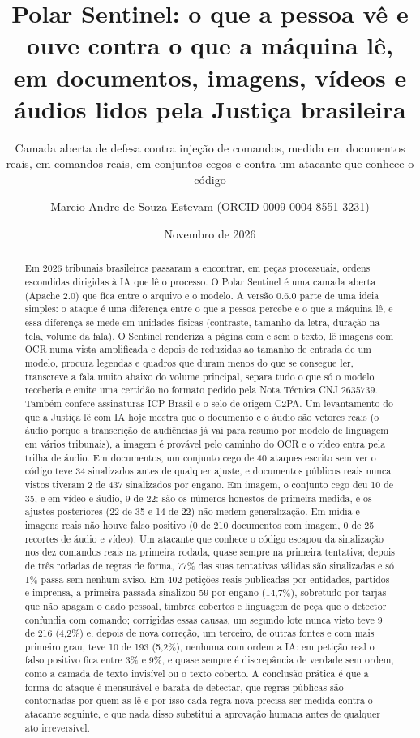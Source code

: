 \documentclass[
  brazilian,
  11pt,
]{article}
\title{Polar Sentinel: o que a pessoa vê e ouve contra o que a máquina
lê, em documentos, imagens, vídeos e áudios lidos pela Justiça
brasileira}
\subtitle{Camada aberta de defesa contra injeção de comandos, medida em
documentos reais, em comandos reais, em conjuntos cegos e contra um
atacante que conhece o código}
\author{Marcio Andre de Souza Estevam (ORCID
\href{https://orcid.org/0009-0004-8551-3231}{0009-0004-8551-3231})}
\date{Novembro de 2026}
\begin{document}
\maketitle
\begin{abstract}
Em 2026 tribunais brasileiros passaram a encontrar, em peças
processuais, ordens escondidas dirigidas à IA que lê o processo. O Polar
Sentinel é uma camada aberta (Apache 2.0) que fica entre o arquivo e o
modelo. A versão 0.6.0 parte de uma ideia simples: o ataque é uma
diferença entre o que a pessoa percebe e o que a máquina lê, e essa
diferença se mede em unidades físicas (contraste, tamanho da letra,
duração na tela, volume da fala). O Sentinel renderiza a página com e
sem o texto, lê imagens com OCR numa vista amplificada e depois de
reduzidas ao tamanho de entrada de um modelo, procura legendas e quadros
que duram menos do que se consegue ler, transcreve a fala muito abaixo
do volume principal, separa tudo o que só o modelo receberia e emite uma
certidão no formato pedido pela Nota Técnica CNJ 2635739. Também confere
assinaturas ICP-Brasil e o selo de origem C2PA. Um levantamento do que a
Justiça lê com IA hoje mostra que o documento e o áudio são vetores
reais (o áudio porque a transcrição de audiências já vai para resumo por
modelo de linguagem em vários tribunais), a imagem é provável pelo
caminho do OCR e o vídeo entra pela trilha de áudio. Em documentos, um
conjunto cego de 40 ataques escrito sem ver o código teve 34 sinalizados
antes de qualquer ajuste, e documentos públicos reais nunca vistos
tiveram 2 de 437 sinalizados por engano. Em imagem, o conjunto cego deu
10 de 35, e em vídeo e áudio, 9 de 22: são os números honestos de
primeira medida, e os ajustes posteriores (22 de 35 e 14 de 22) não
medem generalização. Em mídia e imagens reais não houve falso positivo
(0 de 210 documentos com imagem, 0 de 25 recortes de áudio e vídeo). Um
atacante que conhece o código escapou da sinalização nos dez comandos
reais na primeira rodada, quase sempre na primeira tentativa; depois de
três rodadas de regras de forma, 77\% das suas tentativas válidas são
sinalizadas e só 1\% passa sem nenhum aviso. Em 402 petições reais
publicadas por entidades, partidos e imprensa, a primeira passada
sinalizou 59 por engano (14,7\%), sobretudo por tarjas que não apagam o
dado pessoal, timbres cobertos e linguagem de peça que o detector
confundia com comando; corrigidas essas causas, um segundo lote nunca
visto teve 9 de 216 (4,2\%) e, depois de nova correção, um terceiro, de
outras fontes e com mais primeiro grau, teve 10 de 193 (5,2\%), nenhuma
com ordem a IA: em petição real o falso positivo fica entre 3\% e 9\%, e
quase sempre é discrepância de verdade sem ordem, como a camada de texto
invisível ou o texto coberto. A conclusão prática é que a forma do
ataque é mensurável e barata de detectar, que regras públicas são
contornadas por quem as lê e por isso cada regra nova precisa ser medida
contra o atacante seguinte, e que nada disso substitui a aprovação
humana antes de qualquer ato irreversível.
\end{abstract}
\end{document}
